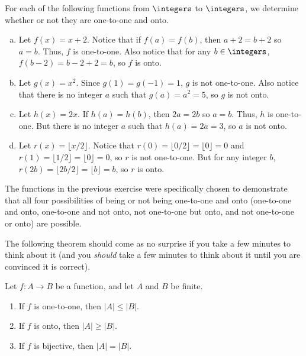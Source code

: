 \begin{exa}
For each of the following functions from
$\integers$ to $\integers$,
we determine whether or not they are
one-to-one and onto.
\begin{enumerate}[(a)]
\item
Let $f(x)=x+2$.
Notice that if $f(a)=f(b)$, then $a+2=b+2$ so $a=b$.  Thus, $f$ is one-to-one.
Also notice that for any $b\in\integers$, $f(b-2)=b-2+2=b$, so $f$ is onto.
\item
Let $g(x)=x^2$.
Since $g(1)=g(-1)=1$, $g$ is not one-to-one.  Also notice that there is no integer $a$ such that
$g(a)=a^2=5$, so $g$ is not onto.
\item
Let $h(x)=2x$.
If $h(a)=h(b)$, then $2a=2b$ so $a=b$.  Thus, $h$ is one-to-one.
But there is no integer $a$ such that $h(a)=2a=3$, so $a$ is not onto.
\item
Let $r(x)=\lfloor x/2\rfloor$.
Notice that $r(0)=\lfloor 0/2\rfloor=\lfloor 0\rfloor = 0$ and 
$r(1)=\lfloor 1/2\rfloor=\lfloor 0\rfloor = 0$, so $r$ is not one-to-one.
But for any integer $b$, $r(2b)=\lfloor 2b/2\rfloor=\lfloor b\rfloor = b$, so $r$ is onto. 
\end{enumerate}
\end{exa}

The functions in the previous exercise were specifically chosen to demonstrate that 
all four possibilities of being or not being one-to-one and onto 
(one-to-one and onto, one-to-one and not onto, not one-to-one but onto, and not one-to-one or onto)
are possible.



The following theorem should come as no surprise if you take a few minutes to think about it
(and you {\em should} take a few minutes to think about it until you are convinced it is correct).

\begin{thm}\label{thm:size_domain_image_injections_surjections}
Let $f:A\to B$ be a function, and let $A$ and $B$ be finite.
\begin{enumerate}
\item
If $f$ is one-to-one, then $|A| \leq |B|$. 
\item
If $f$ is onto, then $|A|\geq |B|$. 
\item
If $f$ is bijective, then $|A| = |B|$.
\end{enumerate}
\end{thm}

